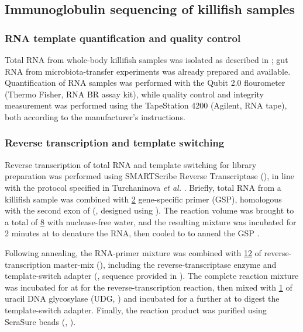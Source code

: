 \subsection{Immunoglobulin sequencing of killifish samples}
\label{sec:methods_molec_igseq}

\subsubsection{RNA template quantification and quality control}
\label{sec:methods_molec_igseq_template}

Total RNA from whole-body killifish samples was isolated as described in ; gut RNA from microbiota-transfer experiments \parencite{smith2017microbiota} was already prepared and available. Quantification of RNA samples was performed with the Qubit 2.0 flourometer (Thermo Fisher, RNA BR assay kit), while quality control and integrity measurement was performed using the TapeStation 4200 (Agilent, RNA tape), both according to the manufacturer's instructions.

\subsubsection{Reverse transcription and template switching}
\label{sec:methods_molec_igseq_rt}

Reverse transcription of total RNA and template switching for \igseq library preparation was performed using SMARTScribe Reverse Transcriptase (), in line with the protocol specified in Turchaninova \textit{et al.} \parencite{turchaninova2016igprep}. Briefly,  total RNA from a killifish sample was combined with \ul{2}  gene-specific primer (GSP), homologous with the second \ch exon of \Nfu {} (, designed using  \parencite{untergasser2012primer3}). The reaction volume was brought to a total of \ul{8} with nuclease-free water, and the resulting mixture was incubated for 2 minutes at  to denature the RNA, then cooled to  to anneal the GSP \parencite{turchaninova2016igprep}.

Following annealing, the RNA-primer mixture was combined with \ul{12} of reverse-transcription master-mix (), including the reverse-transcriptase enzyme and template-switch adapter (, sequence provided in \parencite{turchaninova2016igprep}). The complete reaction mixture was incubated for  at  for the reverse-transcription reaction, then mixed with \ul{1} of uracil DNA glycosylase (UDG, ) and incubated for a further  at  to digest the template-switch adapter. Finally, the reaction product was purified using SeraSure beads (, ).

